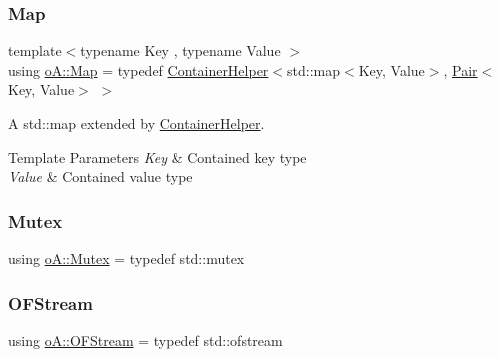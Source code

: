 \mbox{\label{namespaceo_a_a90c973ca401158a4b6c0c71a2d86d933}} 
\subsubsection{\texorpdfstring{Map}{Map}}
{\footnotesize\ttfamily template$<$typename Key , typename Value $>$ \\
using \mbox{\hyperlink{namespaceo_a_a90c973ca401158a4b6c0c71a2d86d933}{o\+A\+::\+Map}} = typedef \mbox{\hyperlink{classo_a_1_1_container_helper}{Container\+Helper}}$<$std\+::map$<$Key, Value$>$, \mbox{\hyperlink{namespaceo_a_a2e4add9f777dcae3f5afde9e90c75b66}{Pair}}$<$Key, Value$>$ $>$}



A std\+::map extended by \mbox{\hyperlink{classo_a_1_1_container_helper}{Container\+Helper}}. 


\begin{DoxyTemplParams}{Template Parameters}
{\em Key} & Contained key type \\
\hline
{\em Value} & Contained value type \\
\hline
\end{DoxyTemplParams}
\mbox{\label{namespaceo_a_adc2c4dfe90e78df47ae2e677a4d0f9fa}} 
\subsubsection{\texorpdfstring{Mutex}{Mutex}}
{\footnotesize\ttfamily using \mbox{\hyperlink{namespaceo_a_adc2c4dfe90e78df47ae2e677a4d0f9fa}{o\+A\+::\+Mutex}} = typedef std\+::mutex}

\mbox{\label{namespaceo_a_a1cab4a0d38a6bab1f5d1390d7a4b5b98}} 
\subsubsection{\texorpdfstring{O\+F\+Stream}{OFStream}}
{\footnotesize\ttfamily using \mbox{\hyperlink{namespaceo_a_a1cab4a0d38a6bab1f5d1390d7a4b5b98}{o\+A\+::\+O\+F\+Stream}} = typedef std\+::ofstream}

\mbox{\label{namespaceo_a_a9075675ddf98c92f09ba17d3b993a72a}} 
